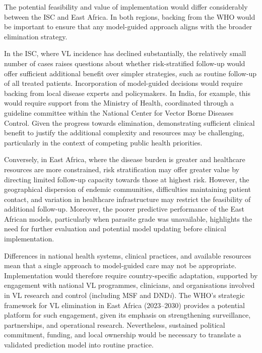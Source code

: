\begin{mccorrection}
  The potential feasibility and value of implementation would differ considerably between the ISC and East Africa. In both regions, backing from the WHO would be important to ensure that any model-guided approach aligns with the broader elimination strategy.

  In the ISC, where VL incidence has declined substantially\cite{NCVBDC2025}, the relatively small number of cases raises questions about whether risk-stratified follow-up would offer sufficient additional benefit over simpler strategies, such as routine follow-up of all treated patients. Incorporation of model-guided decisions would require backing from local disease experts and policymakers. In India, for example, this would require support from the Ministry of Health, coordinated through a guideline committee within the National Center for Vector Borne Diseases Control\cite{NCVBDC2026Guidelines}. Given the progress towards elimination, demonstrating sufficient clinical benefit to justify the additional complexity and resources may be challenging, particularly in the context of competing public health priorities.

  Conversely, in East Africa, where the disease burden is greater and healthcare resources are more constrained, risk stratification may offer greater value by directing limited follow-up capacity towards those at highest risk. However, the geographical dispersion of endemic communities, difficulties maintaining patient contact, and variation in healthcare infrastructure may restrict the feasibility of additional follow-up\cite{Iniguez2026}. Moreover, the poorer predictive performance of the East African models, particularly when parasite grade was unavailable, highlights the need for further evaluation and potential model updating before clinical implementation.

  Differences in national health systems, clinical practices, and available resources mean that a single approach to model-guided care may not be appropriate. Implementation would therefore require country-specific adaptation, supported by engagement with national VL programmes, clinicians, and organisations involved in VL research and control (including MSF and DND\textit{i}). The WHO's strategic framework for VL elimination in East Africa (2023--2030) provides a potential platform for such engagement, given its emphasis on strengthening surveillance, partnerships, and operational research\cite{WHO_2024_VL_easternAfrica}. Nevertheless, sustained political commitment, funding, and local ownership would be necessary to translate a validated prediction model into routine practice.


\end{mccorrection}
